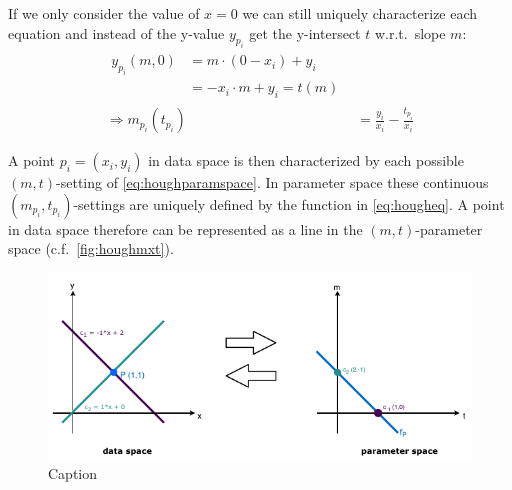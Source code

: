 If we only consider the value of $x=0$ we can still uniquely characterize each equation and instead of the y-value $y_{p_i}$ get the y-intersect $t$ w.r.t.\ slope $m$:
\begin{align}\label{eq:houghparamspace}
\begin{split}
y_{p_i}(m,0) 
&= m \cdot (0 - x_i) + y_i\\
&= -x_i \cdot m + y_i = t(m)
\end{split}\\
\label{eq:hougheq}
\Rightarrow m_{p_i}(t_{p_i}) &= \frac{y_i}{x_i} - \frac{t_{p_i}}{x_i}
\end{align}

A point $p_i = (x_i, y_i)$ in data space is then characterized by each possible $(m,t)$-setting of \autoref{eq:houghparamspace}. In parameter space these continuous $(m_{p_i},t_{p_i})$-settings are uniquely defined by the function in \autoref{eq:hougheq}. A point in data space therefore can be represented as a line in the $(m,t)$-parameter space (c.f.\ \autoref{fig:houghmxt}).  %

\begin{figure}
    \centering
    \includegraphics{figures/HoughMXT.pdf}
    \caption{Caption}
    \label{fig:houghmxt}
\end{figure}


